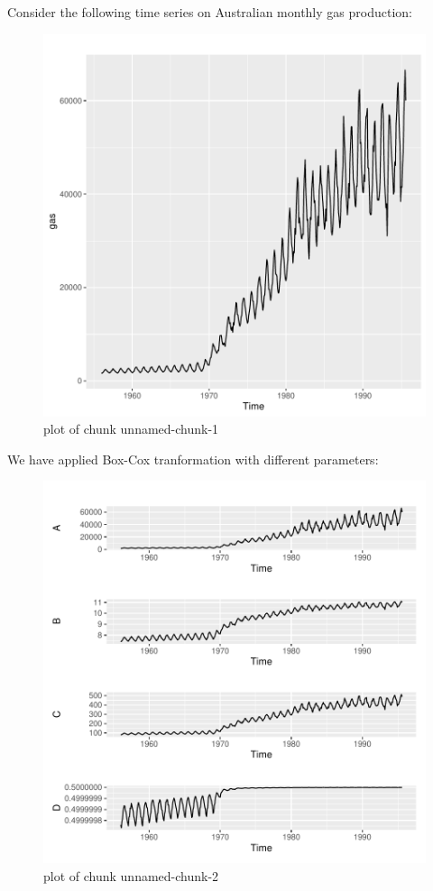 
\begin{question}
Consider the following time series on Australian monthly gas production:

\begin{figure}[H]
\centering
\includegraphics{unnamed-chunk-1-1.pdf}
\caption{plot of chunk unnamed-chunk-1}
\end{figure}

We have applied Box-Cox tranformation with different parameters:

\begin{figure}[H]
\centering
\includegraphics{unnamed-chunk-2-1.pdf}
\caption{plot of chunk unnamed-chunk-2}
\end{figure}


\end{question}
